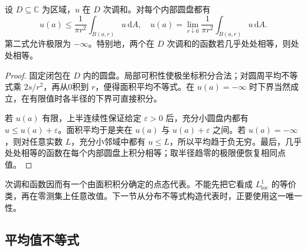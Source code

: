 \begin{proposition}[面积平均与点值恢复]\label{b3:prop:15-area-recovery}
设 \(D\subseteq\mathbb C\) 为区域，\(u\) 在 \(D\) 次调和。对每个内部圆盘都有
\[
 u(a)\le\frac1{\pi r^2}\int_{B(a,r)}u\,\mathrm{d}A,
 \quad
 u(a)=\lim_{r\downarrow0}\frac1{\pi r^2}\int_{B(a,r)}u\,\mathrm{d}A.
\]
第二式允许极限为 \(-\infty\)。特别地，两个在 \(D\) 次调和的函数若几乎处处相等，则处处相等。
\end{proposition}
\begin{proof}
固定闭包在 \(D\) 内的圆盘。局部可积性使极坐标积分合法；对圆周平均不等式乘 \(2s/r^2\)，再从0积到 \(r\)，便得面积平均不等式。在 \(u(a)=-\infty\) 时下界当然成立，在有限值时各半径的下界可直接积分。

若 \(u(a)\) 有限，上半连续性保证给定 \(\varepsilon>0\) 后，充分小圆盘内都有 \(u\le u(a)+\varepsilon\)。面积平均于是夹在 \(u(a)\) 与 \(u(a)+\varepsilon\) 之间。若 \(u(a)=-\infty\)，则对任意实数 \(L\)，充分小邻域中都有 \(u\le L\)，所以平均趋于负无穷。最后，几乎处处相等的函数在每个内部圆盘上积分相等；取半径趋零的极限便恢复相同点值。
\end{proof}
次调和函数因而有一个由面积积分确定的点态代表。不能先把它看成 \(L^1_{\mathrm{loc}}\) 的等价类，再在零测集上任意改值。下一节从分布不等式构造代表时，正要使用这一唯一性。

\subsection{平均值不等式}
\label{b3:subsec:150302}

